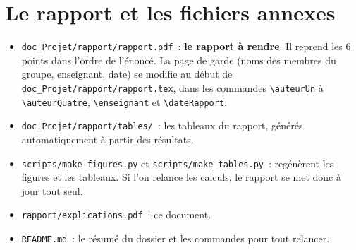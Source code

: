 \documentclass[11pt,a4paper]{article}
\newcommand{\f}[1]{\texttt{#1}}
\begin{document}
\section{Le rapport et les fichiers annexes}
\begin{itemize}
\item \f{doc\_Projet/rapport/rapport.pdf}~: \textbf{le rapport à rendre}. Il reprend les 6 points dans l'ordre de l'énoncé.
La page de garde (noms des membres du groupe, enseignant, date) se modifie au début de \f{doc\_Projet/rapport/rapport.tex}, dans les commandes \f{\textbackslash auteurUn} à \f{\textbackslash auteurQuatre}, \f{\textbackslash enseignant} et \f{\textbackslash dateRapport}.
\item \f{doc\_Projet/rapport/tables/}~: les tableaux du rapport, générés automatiquement à partir des résultats.
\item \f{scripts/make\_figures.py} et \f{scripts/make\_tables.py}~: regénèrent les figures et les tableaux. Si l'on
relance les calculs, le rapport se met donc à jour tout seul.
\item \f{rapport/explications.pdf}~: ce document.
\item \f{README.md}~: le résumé du dossier et les commandes pour tout relancer.
\end{itemize}
\end{document}
